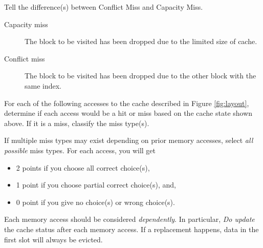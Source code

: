 \begin{questions}
{}

\newpage

\question[3] Tell the difference(s) between Conflict Miss and
Capacity Miss.
{

    \begin{solution}
    \vspace{.1in}
            \begin{description}
                \item[Capacity miss]The block to be visited has been dropped due to the limited size of cache.
                \item[Conflict miss]The block to be visited has been dropped due to the other block with the same index.
            \end{description}
            \vspace{.3in}
    \end{solution}

}


\question[12] For each of the following accesses to the cache
described in Figure \ref{fig:layout}, determine if each
access would be a hit or miss based on the cache state shown above.
If it is a miss, classify the miss type(s). \label{access_simulate}

If multiple miss types may exist depending on prior memory accesses,
select \emph{all possible} miss types. For each access, you will get
\begin{itemize}
    \item 2 points if you choose all correct choice(s),
    \item 1 point if you choose partial correct choice(s), and,
    \item 0 point if you give no choice(s) or wrong choice(s).
\end{itemize}

Each memory access should be considered \emph{dependently}.
In particular, \emph{Do update} the cache status after each memory
access. If a replacement happens, data in the first slot will 
always be evicted.



\end{questions}
